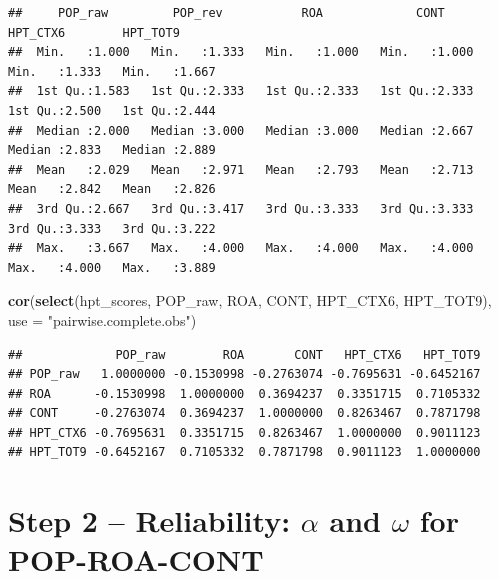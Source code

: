 \documentclass[
  10pt,
]{article}
\newenvironment{Shaded}{\begin{snugshade}}{\end{snugshade}}
\newcommand{\AttributeTok}[1]{\textcolor[rgb]{0.13,0.29,0.53}{#1}}
\newcommand{\FunctionTok}[1]{\textcolor[rgb]{0.13,0.29,0.53}{\textbf{#1}}}
\newcommand{\NormalTok}[1]{#1}
\newcommand{\StringTok}[1]{\textcolor[rgb]{0.31,0.60,0.02}{#1}}
\begin{document}
\begin{verbatim}
##     POP_raw         POP_rev           ROA             CONT          HPT_CTX6        HPT_TOT9
##  Min.   :1.000   Min.   :1.333   Min.   :1.000   Min.   :1.000   Min.   :1.333   Min.   :1.667
##  1st Qu.:1.583   1st Qu.:2.333   1st Qu.:2.333   1st Qu.:2.333   1st Qu.:2.500   1st Qu.:2.444
##  Median :2.000   Median :3.000   Median :3.000   Median :2.667   Median :2.833   Median :2.889
##  Mean   :2.029   Mean   :2.971   Mean   :2.793   Mean   :2.713   Mean   :2.842   Mean   :2.826
##  3rd Qu.:2.667   3rd Qu.:3.417   3rd Qu.:3.333   3rd Qu.:3.333   3rd Qu.:3.333   3rd Qu.:3.222
##  Max.   :3.667   Max.   :4.000   Max.   :4.000   Max.   :4.000   Max.   :4.000   Max.   :3.889
\end{verbatim}

\begin{Shaded}
\begin{Highlighting}[]
\FunctionTok{cor}\NormalTok{(}\FunctionTok{select}\NormalTok{(hpt\_scores, POP\_raw, ROA, CONT, HPT\_CTX6, HPT\_TOT9), }\AttributeTok{use =} \StringTok{"pairwise.complete.obs"}\NormalTok{)}
\end{Highlighting}
\end{Shaded}

\begin{verbatim}
##             POP_raw        ROA       CONT   HPT_CTX6   HPT_TOT9
## POP_raw   1.0000000 -0.1530998 -0.2763074 -0.7695631 -0.6452167
## ROA      -0.1530998  1.0000000  0.3694237  0.3351715  0.7105332
## CONT     -0.2763074  0.3694237  1.0000000  0.8263467  0.7871798
## HPT_CTX6 -0.7695631  0.3351715  0.8263467  1.0000000  0.9011123
## HPT_TOT9 -0.6452167  0.7105332  0.7871798  0.9011123  1.0000000
\end{verbatim}

\hypertarget{step-2-reliability-alpha-and-omega-for-pop-roa-cont}{%
\section{\texorpdfstring{Step 2 -- Reliability: \(\alpha\) and
\(\omega\) for
POP-ROA-CONT}{Step 2 -- Reliability: \textbackslash alpha and \textbackslash omega for POP-ROA-CONT}}\label{step-2-reliability-alpha-and-omega-for-pop-roa-cont}}
\end{document}
